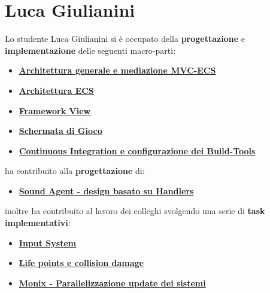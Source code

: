 \section{Luca Giulianini}
Lo studente Luca Giulianini si è occupato della \textbf{progettazione} e \textbf{implementazione} delle seguenti macro-parti:
\begin{itemize}
	\item \hyperref[subsec:arc_mediator]{\textbf{Architettura generale e mediazione MVC-ECS}}
	\item \hyperref[subsec:arc_ecs]{\textbf{Architettura ECS}}
	\item \hyperref[subsec:arc_view]{\textbf{Framework View}}
	\item \hyperref[subsec:game_screen]{\textbf{Schermata di Gioco}}
	\item \hyperref[subsec:ci]{\textbf{Continuous Integration e configurazione dei Build-Tools}}
\end{itemize}
ha contribuito alla \textbf{progettazione} di:
\begin{itemize}
	\item \hyperref[subsec:media_event]{\textbf{Sound Agent - design basato su Handlers}}
\end{itemize}
inoltre ha contribuito al lavoro dei colleghi svolgendo una serie di \textbf{task implementativi}:
\begin{itemize}
	\item \hyperref[subsubsec:input_sys]{\textbf{Input System}}
	\item \hyperref[subsubsec:damage]{\textbf{Life points e collision damage}}
	\item \hyperref[subsubsec:monix_sys]{\textbf{Monix - Parallelizzazione update dei sistemi}}
\end{itemize}

